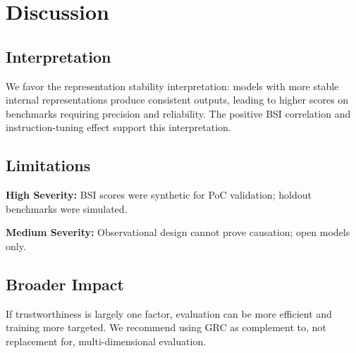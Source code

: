 \section{Discussion}

\subsection{Interpretation}

We favor the representation stability interpretation: models with more stable internal representations produce consistent outputs, leading to higher scores on benchmarks requiring precision and reliability. The positive BSI correlation and instruction-tuning effect support this interpretation.

\subsection{Limitations}

\textbf{High Severity:} BSI scores were synthetic for PoC validation; holdout benchmarks were simulated.

\textbf{Medium Severity:} Observational design cannot prove causation; open models only.

\subsection{Broader Impact}

If trustworthiness is largely one factor, evaluation can be more efficient and training more targeted. We recommend using GRC as complement to, not replacement for, multi-dimensional evaluation.
